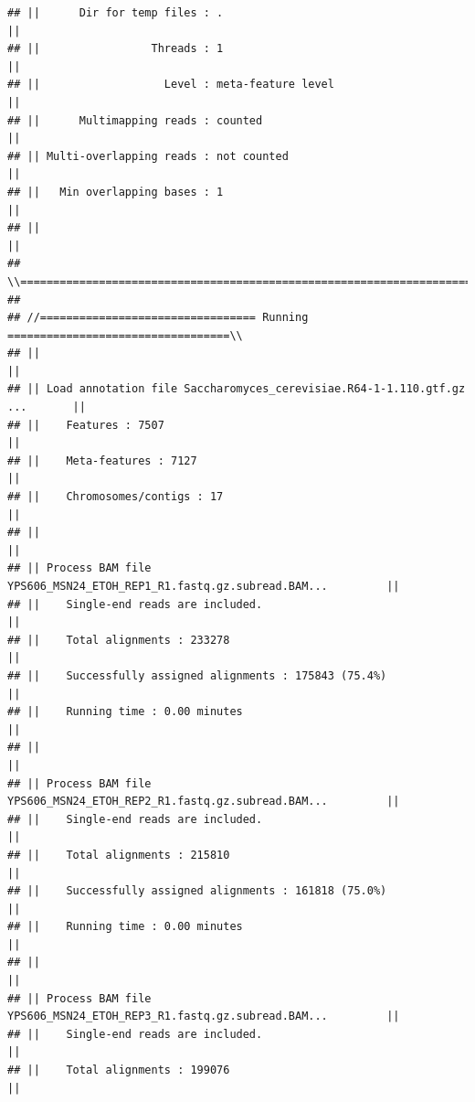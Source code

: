 \documentclass[
]{book}
\begin{document}
\begin{verbatim}
## ||      Dir for temp files : .                                                ||
## ||                 Threads : 1                                                ||
## ||                   Level : meta-feature level                               ||
## ||      Multimapping reads : counted                                          ||
## || Multi-overlapping reads : not counted                                      ||
## ||   Min overlapping bases : 1                                                ||
## ||                                                                            ||
## \\============================================================================//
## 
## //================================= Running ==================================\\
## ||                                                                            ||
## || Load annotation file Saccharomyces_cerevisiae.R64-1-1.110.gtf.gz ...       ||
## ||    Features : 7507                                                         ||
## ||    Meta-features : 7127                                                    ||
## ||    Chromosomes/contigs : 17                                                ||
## ||                                                                            ||
## || Process BAM file YPS606_MSN24_ETOH_REP1_R1.fastq.gz.subread.BAM...         ||
## ||    Single-end reads are included.                                          ||
## ||    Total alignments : 233278                                               ||
## ||    Successfully assigned alignments : 175843 (75.4%)                       ||
## ||    Running time : 0.00 minutes                                             ||
## ||                                                                            ||
## || Process BAM file YPS606_MSN24_ETOH_REP2_R1.fastq.gz.subread.BAM...         ||
## ||    Single-end reads are included.                                          ||
## ||    Total alignments : 215810                                               ||
## ||    Successfully assigned alignments : 161818 (75.0%)                       ||
## ||    Running time : 0.00 minutes                                             ||
## ||                                                                            ||
## || Process BAM file YPS606_MSN24_ETOH_REP3_R1.fastq.gz.subread.BAM...         ||
## ||    Single-end reads are included.                                          ||
## ||    Total alignments : 199076                                               ||

\end{verbatim}
\end{document}

